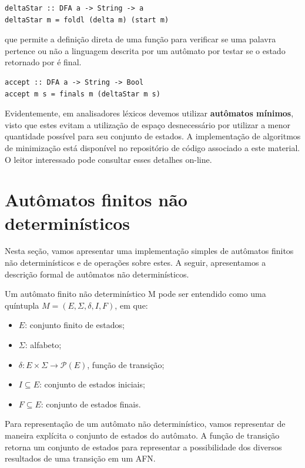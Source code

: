 \begin{verbatim}
deltaStar :: DFA a -> String -> a
deltaStar m = foldl (delta m) (start m)
\end{verbatim}

que permite a definição direta de uma função para verificar se uma
palavra pertence ou não a linguagem descrita por um autômato por
testar se o estado retornado por  é final.

\begin{verbatim}
accept :: DFA a -> String -> Bool
accept m s = finals m (deltaStar m s)
\end{verbatim}

Evidentemente, em analisadores léxicos devemos utilizar
\textbf{autômatos mínimos}, visto que estes evitam a utilização de
espaço desnecessário por utilizar a menor quantidade possível para
seu conjunto de estados. A implementação de algoritmos de minimização
está disponível no repositório de código associado a este material. O
leitor interessado pode consultar esses detalhes on-line.

\section{Autômatos finitos não determinísticos}

Nesta seção, vamos apresentar uma implementação simples de autômatos
finitos não determinísticos e de operações sobre estes. A seguir,
apresentamos a descrição formal de autômatos não determinísticos.

\begin{Definition}
  Um autômato finito não determinístico M pode ser
  entendido como uma quíntupla \(M = (E,\Sigma, \delta, I, F)\), em que:

  \begin{itemize}
    \item
      \(E\): conjunto finito de estados;
    \item
      \(\Sigma\): alfabeto;
    \item
      \(\delta : E \times \Sigma \to \mathcal{P}(E)\), função de transição;
    \item
      \(I \subseteq E\): conjunto de estados iniciais;
    \item
      \(F \subseteq E\): conjunto de estados finais.
  \end{itemize}
\end{Definition}

Para representação de um autômato não determinístico, vamos
representar de maneira explícita o conjunto de estados do autômato. A
função de transição retorna um conjunto de estados para representar a
possibilidade dos diversos resultados de uma transição em um AFN.

